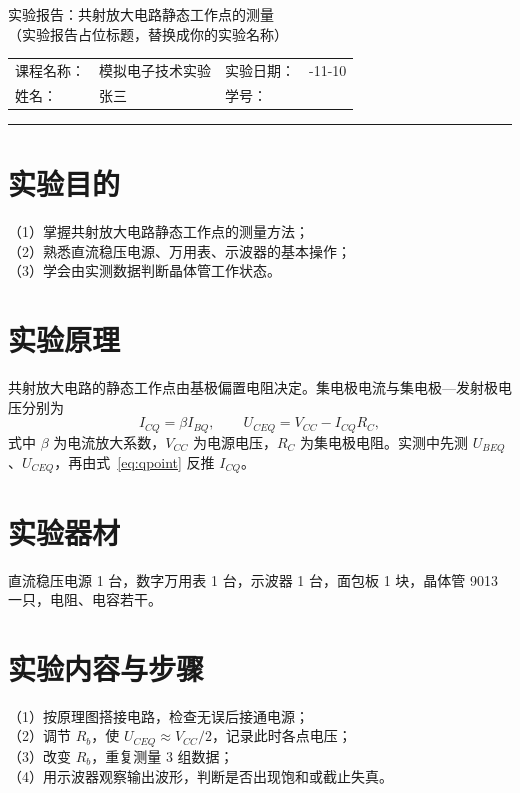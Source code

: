 \documentclass[UTF8,a4paper,zihao=-4,fontset=\swfontset]{ctexart}
\makeatletter
\newcommand{\labinfo}[4]{%
  \noindent
  \begin{tabular}{@{}>{\raggedright\arraybackslash}p{0.18\textwidth}%
                     >{\raggedright\arraybackslash}p{0.25\textwidth}%
                     >{\raggedright\arraybackslash}p{0.18\textwidth}%
                     >{\raggedright\arraybackslash}p{0.25\textwidth}@{}}
    课程名称： & #1 & 实验日期： & #2 \\
    姓\qquad 名： & #3 & 学\qquad 号： & #4 \\
  \end{tabular}\par\vspace{0.6em}\hrule\vspace{0.8em}
}
\makeatother
\begin{document}
\begin{center}
  {\heiti 实验报告：共射放大电路静态工作点的测量}\\[0.6em]
  {（实验报告占位标题，替换成你的实验名称）}
\end{center}

\labinfo{模拟电子技术实验}{2026-11-10}{张三}{2026000000}

\section{实验目的}

（1）掌握共射放大电路静态工作点的测量方法；\\
（2）熟悉直流稳压电源、万用表、示波器的基本操作；\\
（3）学会由实测数据判断晶体管工作状态。

\section{实验原理}

共射放大电路的静态工作点由基极偏置电阻决定。集电极电流与集电极—发射极电压分别为
\begin{equation}
  I_{CQ}=\beta I_{BQ},\qquad
  U_{CEQ}=V_{CC}-I_{CQ}R_{C},
  \label{eq:qpoint}
\end{equation}
式中 $\beta$ 为电流放大系数，$V_{CC}$ 为电源电压，$R_{C}$ 为集电极电阻。实测中先测 $U_{BEQ}$、$U_{CEQ}$，再由式~\eqref{eq:qpoint} 反推 $I_{CQ}$。

\section{实验器材}

直流稳压电源 1 台，数字万用表 1 台，示波器 1 台，面包板 1 块，晶体管 9013 一只，电阻、电容若干。

\section{实验内容与步骤}

（1）按原理图搭接电路，检查无误后接通电源；\\
（2）调节 $R_{b}$，使 $U_{CEQ}\approx V_{CC}/2$，记录此时各点电压；\\
（3）改变 $R_{b}$，重复测量 3 组数据；\\
（4）用示波器观察输出波形，判断是否出现饱和或截止失真。
\end{document}
